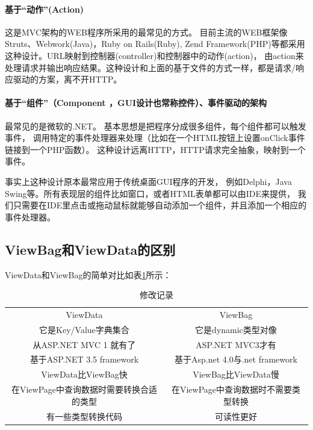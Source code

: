 \documentclass{book}
\begin{document}
\paragraph{基于“动作”(Action)}这是MVC架构的WEB程序所采用的最常见的方式。
目前主流的WEB框架像Struts、Webwork(Java)，Ruby on Rails(Ruby),
Zend Framework(PHP)等都采用这种设计。URL映射到控制器(controller)和控制器中的动作(action)，
由action来处理请求并输出响应结果。这种设计和上面的基于文件的方式一样，都是请求/响应驱动的方案，离不开HTTP。

\paragraph{基于“组件”（Component ，GUI设计也常称控件）、事件驱动的架构}最常见的是微软的.NET。
基本思想是把程序分成很多组件，每个组件都可以触发事件，
调用特定的事件处理器来处理（比如在一个HTML按钮上设置onClick事件链接到一个PHP函数）。
这种设计远离HTTP，HTTP请求完全抽象，映射到一个事件。

事实上这种设计原本最常应用于传统桌面GUI程序的开发，
例如Delphi，Java Swing等。所有表现层的组件比如窗口，或者HTML表单都可以由IDE来提供，
我们只需要在IDE里点击或拖动鼠标就能够自动添加一个组件，并且添加一个相应的事件处理器。

\subsection{ViewBag和ViewData的区别}

ViewData和ViewBag的简单对比如表\ref{TheDiffOfViewData}所示：

\begin{table}\caption[Caption for LOF]{修改记录}\label{TheDiffOfViewData}					
	\medskip
	\centering		
	\begin{tabular}{|c|c|}
		\hline
		\multirow{1}{*}{ViewData}		
		& \multicolumn{1}{c|}{ViewBag}\\			
		\cline{1-2}
		 它是Key/Value字典集合 &  它是dynamic类型对像\\
		\hline
		 从ASP.NET MVC 1 就有了 & ASP.NET MVC3才有 \\
		\hline
		 基于ASP.NET 3.5 framework & 基于Asp.net 4.0与.net framework\\
		\hline
		 ViewData比ViewBag快 & ViewBag比ViewData慢\\
		\hline
		 在ViewPage中查询数据时需要转换合适的类型 & 在ViewPage中查询数据时不需要类型转换\\
		\hline
		 有一些类型转换代码 & 可读性更好\\
		 \hline
	\end{tabular}
\end{table}
\end{document}
